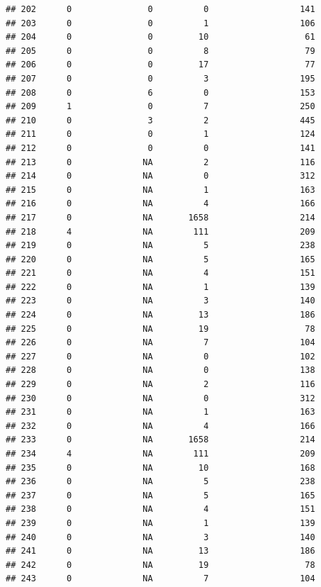 \documentclass[
]{article}
\begin{document}
\begin{verbatim}
## 202      0               0          0                  141
## 203      0               0          1                  106
## 204      0               0         10                   61
## 205      0               0          8                   79
## 206      0               0         17                   77
## 207      0               0          3                  195
## 208      0               6          0                  153
## 209      1               0          7                  250
## 210      0               3          2                  445
## 211      0               0          1                  124
## 212      0               0          0                  141
## 213      0              NA          2                  116
## 214      0              NA          0                  312
## 215      0              NA          1                  163
## 216      0              NA          4                  166
## 217      0              NA       1658                  214
## 218      4              NA        111                  209
## 219      0              NA          5                  238
## 220      0              NA          5                  165
## 221      0              NA          4                  151
## 222      0              NA          1                  139
## 223      0              NA          3                  140
## 224      0              NA         13                  186
## 225      0              NA         19                   78
## 226      0              NA          7                  104
## 227      0              NA          0                  102
## 228      0              NA          0                  138
## 229      0              NA          2                  116
## 230      0              NA          0                  312
## 231      0              NA          1                  163
## 232      0              NA          4                  166
## 233      0              NA       1658                  214
## 234      4              NA        111                  209
## 235      0              NA         10                  168
## 236      0              NA          5                  238
## 237      0              NA          5                  165
## 238      0              NA          4                  151
## 239      0              NA          1                  139
## 240      0              NA          3                  140
## 241      0              NA         13                  186
## 242      0              NA         19                   78
## 243      0              NA          7                  104

\end{verbatim}
\end{document}
